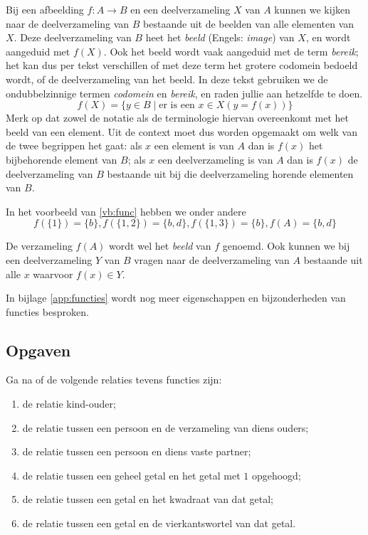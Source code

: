 Bij een afbeelding $f:A\rightarrow B$ en een deelverzameling $X$ van $A$ kunnen we kijken naar de deelverzameling van $B$ bestaande uit de beelden van alle elementen van $X$. Deze deelverzameling van $B$ heet het \textit{beeld} (Engels: \textit{image}) van $X$, en wordt aangeduid met $f(X)$. Ook het beeld wordt vaak aangeduid met de term \textit{bereik}; het kan dus per tekst verschillen of met deze term het grotere codomein bedoeld wordt, of de deelverzameling van het beeld. In deze tekst gebruiken we de ondubbelzinnige termen \textit{codomein} en \textit{bereik}, en raden jullie aan hetzelfde te doen.
$$f(X) = \{y\in B\;|\;\text{er is een } x\in X(y=f(x))\}$$
Merk op dat zowel de notatie als de terminologie hiervan overeenkomt met het beeld van een element. Uit de context moet dus worden opgemaakt om welk van de twee begrippen het gaat: als $x$ een element is van $A$ dan is $f(x)$ het bijbehorende element van $B$; als $x$ een deelverzameling is van $A$ dan is $f(x)$ de deelverzameling van $B$ bestaande uit bij die deelverzameling horende elementen van $B$.

In het voorbeeld van \ref{vb:func} hebben we onder andere
$$f(\{1\})=\{b\}, f(\{1,2\})=\{b,d\}, f(\{1,3\})=\{b\},f(A)=\{b,d\}$$

De verzameling $f(A)$ wordt wel het \textit{beeld} van $f$ genoemd. Ook kunnen we bij een deelverzameling $Y$ van $B$ vragen naar de deelverzameling van $A$ bestaande uit alle $x$ waarvoor $f(x)\in Y$.

In bijlage \ref{app:functies} wordt nog meer eigenschappen en bijzonderheden van functies besproken.

\subsection{Opgaven}

\begin{exercise}
  Ga na of de volgende relaties tevens functies zijn:\mbox{}\\
  \begin{enumerate}[label=\textbf{\alph*.}]
    \item de relatie kind-ouder;
    \item de relatie tussen een persoon en de verzameling van diens ouders;
    \item de relatie tussen een persoon en diens vaste partner;
    \item de relatie tussen een geheel getal en het getal met $1$ opgehoogd;
    \item de relatie tussen een getal en het kwadraat van dat getal;
    \item de relatie tussen een getal en de vierkantswortel van dat getal.
  \end{enumerate}
\end{exercise}

